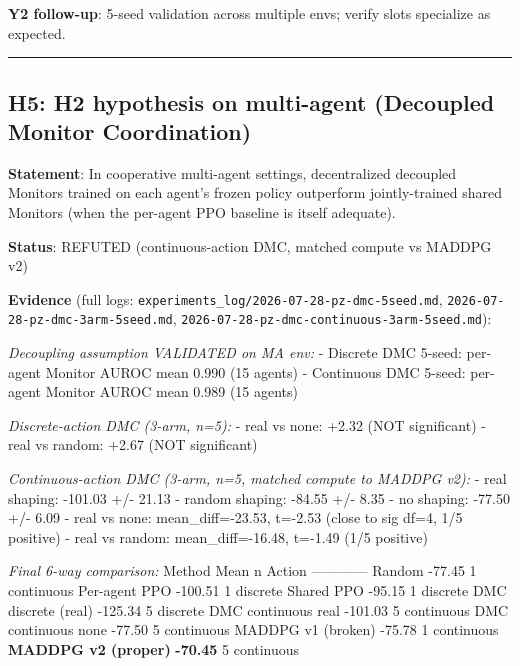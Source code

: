 \documentclass[
]{article}
\newcounter{none} %
\begin{document}
\textbf{Y2 follow-up}: 5-seed validation across multiple envs; verify
slots specialize as expected.

\begin{center}\rule{0.5\linewidth}{0.5pt}\end{center}

\subsection{H5: H2 hypothesis on multi-agent (Decoupled Monitor
Coordination)}\label{h5-h2-hypothesis-on-multi-agent-decoupled-monitor-coordination}

\textbf{Statement}: In cooperative multi-agent settings, decentralized
decoupled Monitors trained on each agent's frozen policy outperform
jointly-trained shared Monitors (when the per-agent PPO baseline is
itself adequate).

\textbf{Status}: REFUTED (continuous-action DMC, matched compute vs
MADDPG v2)

\textbf{Evidence} (full logs:
\texttt{experiments\_log/2026-07-28-pz-dmc-5seed.md},
\texttt{2026-07-28-pz-dmc-3arm-5seed.md},
\texttt{2026-07-28-pz-dmc-continuous-3arm-5seed.md}):

\emph{Decoupling assumption VALIDATED on MA env:} - Discrete DMC 5-seed:
per-agent Monitor AUROC mean 0.990 (15 agents) - Continuous DMC 5-seed:
per-agent Monitor AUROC mean 0.989 (15 agents)

\emph{Discrete-action DMC (3-arm, n=5):} - real vs none: +2.32 (NOT
significant) - real vs random: +2.67 (NOT significant)

\emph{Continuous-action DMC (3-arm, n=5, matched compute to MADDPG v2):}
- real shaping: -101.03 +/- 21.13 - random shaping: -84.55 +/- 8.35 - no
shaping: -77.50 +/- 6.09 - real vs none: mean\_diff=-23.53, t=-2.53
(close to sig df=4, 1/5 positive) - real vs random: mean\_diff=-16.48,
t=-1.49 (1/5 positive)

\emph{Final 6-way comparison:} \textbar{} Method \textbar{} Mean
\textbar{} n \textbar{} Action \textbar{}
\textbar---\textbar---\textbar---\textbar---\textbar{} \textbar{} Random
\textbar{} -77.45 \textbar{} 1 \textbar{} continuous \textbar{}
\textbar{} Per-agent PPO \textbar{} -100.51 \textbar{} 1 \textbar{}
discrete \textbar{} \textbar{} Shared PPO \textbar{} -95.15 \textbar{} 1
\textbar{} discrete \textbar{} \textbar{} DMC discrete (real) \textbar{}
-125.34 \textbar{} 5 \textbar{} discrete \textbar{} \textbar{} DMC
continuous real \textbar{} -101.03 \textbar{} 5 \textbar{} continuous
\textbar{} \textbar{} DMC continuous none \textbar{} -77.50 \textbar{} 5
\textbar{} continuous \textbar{} \textbar{} MADDPG v1 (broken)
\textbar{} -75.78 \textbar{} 1 \textbar{} continuous \textbar{}
\textbar{} \textbf{MADDPG v2 (proper)} \textbar{} \textbf{-70.45}
\textbar{} 5 \textbar{} continuous \textbar{}
\end{document}
